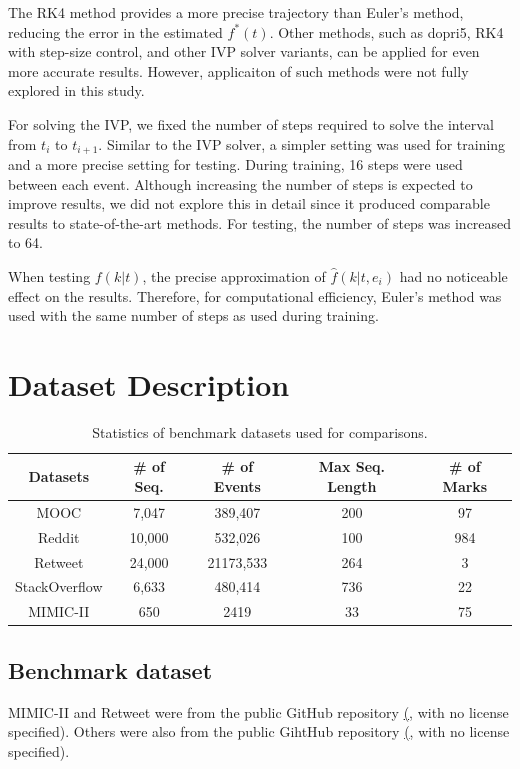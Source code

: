 The RK4 method provides a more precise trajectory than Euler's method, reducing the error in the estimated $f^*(t)$. Other methods, such as dopri5, RK4 with step-size control, and other IVP solver variants, can be applied for even more accurate results. However, applicaiton of such methods were not fully explored in this study.

For solving the IVP, we fixed the number of steps required to solve the interval from $t_i$ to $t_{i+1}$. Similar to the IVP solver, a simpler setting was used for training and a more precise setting for testing. During training, 16 steps were used between each event. Although increasing the number of steps is expected to improve results, we did not explore this in detail since it produced comparable results to state-of-the-art methods. For testing, the number of steps was increased to 64.

When testing $f(k|t)$, the precise approximation of $\hat{f}(k|t, e_i)$ had no noticeable effect on the results. Therefore, for computational efficiency, Euler's method was used with the same number of steps as used during training.


\section{Dataset Description \label{sec:data-desc}}
\begin{table}[h]
    \centering
    \renewcommand{\arraystretch}{1.3}
        \begin{tabular}{c|c c c c}
            Datasets & \# of Seq. & \# of Events & Max Seq. Length & \# of Marks \\
            \hline
             MOOC & 7,047 & 389,407 & 200 & 97 \\ 
             Reddit & 10,000 & 532,026 & 100 & 984 \\ 
             Retweet & 24,000 & 21173,533 & 264 & 3 \\ 
             StackOverflow & 6,633 & 480,414 & 736 & 22 \\ 
             MIMIC-II & 650 & 2419 & 33 & 75 \\ 
        \end{tabular}
        \caption{Statistics of benchmark datasets used for comparisons.}
        \label{tab:data_stat}
    \end{table}

\subsection{Benchmark dataset}
MIMIC-II and Retweet were from the public GitHub repository \href{https://github.com/SimiaoZuo/Transformer-Hawkes-Process} (\cite{bib:THP}, with no license specified). Others were also from the public GihtHub repository \href{https://github.com/BIRD-TAO/GNTPP} (\cite{bib:exploring_generative}, with no license specified). 

